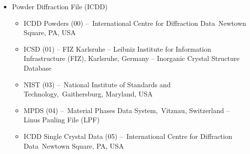 



\begin{itemize}
\item Powder Diffraction File (ICDD)
\begin{itemize}
    \item ICDD Powders (00) – International Centre for Diffraction Data Newtown Square, PA, USA
    \item ICSD (01) – FIZ Karlsruhe – Leibniz Institute for Information Infrastructure (FIZ), Karlsruhe, Germany – Inorganic Crystal Structure Database
    \item NIST (03) – National Institute of Standards and Technology, Gaithersburg, Maryland, USA
    \item MPDS (04) – Material Phases Data System, Vitznau, Switzerland – Linus Pauling File (LPF)
    \item ICDD Single Crystal Data (05) – International Centre for Diffraction Data Newtown Square, PA, USA
\end{itemize}
\end{itemize}
 
